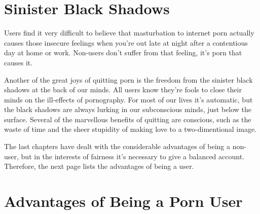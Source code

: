 \documentclass[easypeasy.tex]{subfiles}
\begin{document}
\section{Sinister Black Shadows}

Users find it very difficult to believe that masturbation to internet porn actually causes those insecure feelings when you're out late at night after a contentious day at home or work. Non-users don't suffer from that feeling, it's porn that causes it.

Another of the great joys of quitting porn is the freedom from the sinister black shadows at the back of our minds. All users know they're fools to close their minds on the ill-effects of pornography. For most of our lives it's automatic, but the black shadows are always lurking in our subconscious minds, just below the surface. Several of the marvellous benefits of quitting are conscious, such as the waste of time and the sheer stupidity of making love to a two-dimentional image. 

The last chapters have dealt with the considerable advantages of being a non-user, but in the interests of fairness it's necessary to give a balanced account. Therefore, the next page lists the advantages of being a user.

\newpage
\section{Advantages of Being a Porn User}
\end{document}
